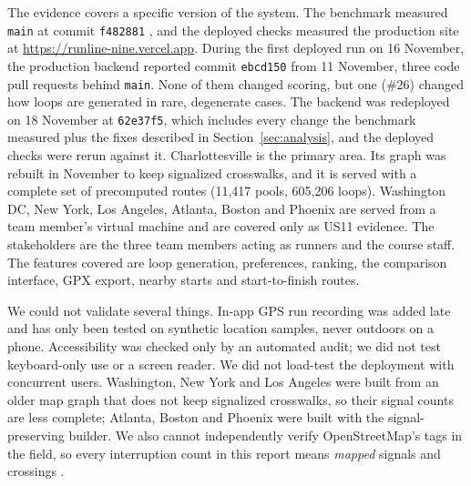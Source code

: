 The evidence covers a specific version of the system. The benchmark measured
\texttt{main} at commit \texttt{f482881} \citep{runline2026repo}, and the
deployed checks measured the production site at
\url{https://runline-nine.vercel.app}. During the first deployed run on
16 November, the production backend reported commit \texttt{ebcd150} from
11 November, three code pull requests behind \texttt{main}. None of them
changed scoring, but one (\#26) changed how loops are generated in rare,
degenerate cases. The backend was redeployed on 18 November at
\texttt{62e37f5}, which includes every change the benchmark measured plus the
fixes described in Section~\ref{sec:analysis}, and the deployed checks were
rerun against it. Charlottesville
is the primary area. Its graph was rebuilt in November to keep signalized
crosswalks, and it is served with a complete set of precomputed routes
(11,417 pools, 605,206 loops). Washington DC, New York, Los Angeles, Atlanta,
Boston and Phoenix are served from a team member's virtual machine and are
covered only as US11 evidence. The stakeholders are the three team members
acting as runners and the course staff. The features covered are loop
generation, preferences, ranking, the comparison interface, GPX export,
nearby starts and start-to-finish routes.

We could not validate several things. In-app GPS run recording was added late
and has only been tested on synthetic location samples, never outdoors on a
phone. Accessibility was checked only by an automated audit; we did not test
keyboard-only use or a screen reader. We did not load-test the deployment with concurrent users. Washington,
New York and Los Angeles were built from an older map graph that does not
keep signalized crosswalks, so their signal counts are less complete;
Atlanta, Boston and Phoenix were built with the signal-preserving builder. We also cannot independently verify OpenStreetMap's tags in the
field, so every interruption count in this report means \emph{mapped}
signals and crossings \citep{osmwiki2026signals}.

